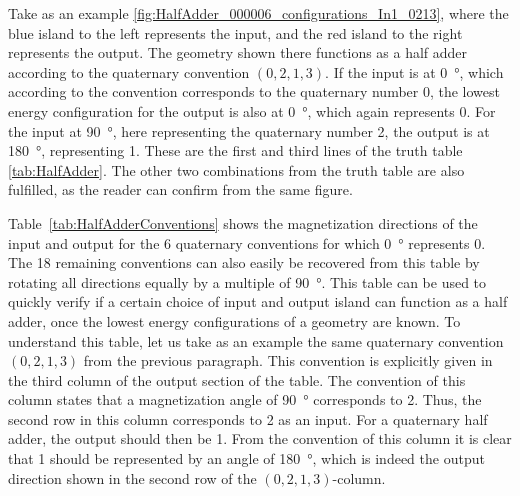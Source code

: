 \documentclass[11pt,a4paper,english]{article}
\begin{document}
Take as an example \cref{fig:HalfAdder_000006_configurations_In1_0213}, where the blue island to the left represents the input, and the red island to the right represents the output. The geometry shown there functions as a half adder according to the quaternary convention $(0, 2, 1, 3)$. If the input is at \SI{0}{\degree}, which according to the convention corresponds to the quaternary number 0, the lowest energy configuration for the output is also at \SI{0}{\degree}, which again represents 0. For the input at \SI{90}{\degree}, here representing the quaternary number 2, the output is at \SI{180}{\degree}, representing 1. These are the first and third lines of the truth table~ \ref{tab:HalfAdder}. The other two combinations from the truth table are also fulfilled, as the reader can confirm from the same figure. \par
Table~\ref{tab:HalfAdderConventions} shows the magnetization directions of the input and output for the 6 quaternary conventions for which \SI{0}{\degree} represents 0. The 18 remaining conventions can also easily be recovered from this table by rotating all directions equally by a multiple of \SI{90}{\degree}. This table can be used to quickly verify if a certain choice of input and output island can function as a half adder, once the lowest energy configurations of a geometry are known. To understand this table, let us take as an example the same quaternary convention $(0, 2, 1, 3)$ from the previous paragraph. This convention is explicitly given in the third column of the output section of the table. The convention of this column states that a magnetization angle of \SI{90}{\degree} corresponds to 2. Thus, the second row in this column corresponds to 2 as an input. For a quaternary half adder, the output should then be 1. From the convention of this column it is clear that 1 should be represented by an angle of \SI{180}{\degree}, which is indeed the output direction shown in the second row of the $(0, 2, 1, 3)$-column.
\end{document}
